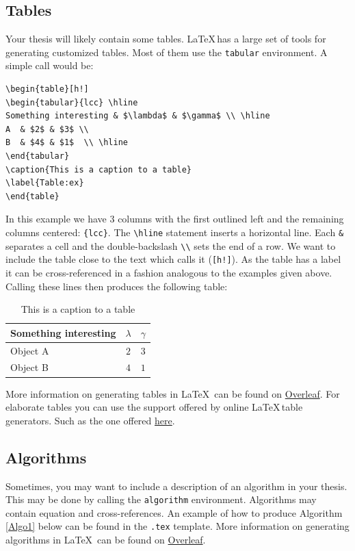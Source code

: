 \documentclass{amsart}
\theoremstyle{plain}
\begin{document}
\subsection{Tables}\label{Tables}
Your thesis will likely contain some tables.
\LaTeX \,has a large set of tools for generating customized tables.
Most of them use the \texttt{tabular} environment.
A simple call would be:
\begin{verbatim}
\begin{table}[h!]
\begin{tabular}{lcc} \hline
Something interesting & $\lambda$ & $\gamma$ \\ \hline
A  & $2$ & $3$ \\
B  & $4$ & $1$  \\ \hline
\end{tabular}
\caption{This is a caption to a table}
\label{Table:ex}
\end{table}
\end{verbatim}
In this example we have 3 columns with the first outlined left and the remaining columns centered: \verb|{lcc}|.
The \verb|\hline| statement inserts a horizontal line.
Each \verb|&| separates a cell and the double-backslash \verb|\\| sets the end of a row.
We want to include the table close to the text which calls it (\verb|[h!]|).
As the table has a label it can be cross-referenced in a fashion analogous to the examples given above.
Calling these lines then produces the following table:
\begin{table}[h!]
\caption{This is a caption to a table}
\begin{tabular}{lcc} \hline
Something interesting & $\lambda$ & $\gamma$ \\ \hline
Object A  & $2$ & $3$ \\
Object B  & $4$ & $1$  \\ \hline
\end{tabular}
\label{Table:ex}
\end{table}

More information on generating tables in \LaTeX \, can be found on \href{https://www.overleaf.com/learn/latex/tables}{Overleaf}.
For elaborate tables you can use the support offered by online \LaTeX \,table generators.
Such as the one offered \href{https://www.tablesgenerator.com/}{here}.


\subsection{Algorithms}\label{Algos}
Sometimes, you may want to include a description of an algorithm in your thesis.
This may be done by calling the \texttt{algorithm} environment.
Algorithms may contain equation and cross-references.
An example of how to produce Algorithm \ref{Algo1} below can be found in the \texttt{.tex} template.
More information on generating algorithms in \LaTeX \, can be found on \href{https://www.overleaf.com/learn/latex/algorithms}{Overleaf}.
\end{document}
